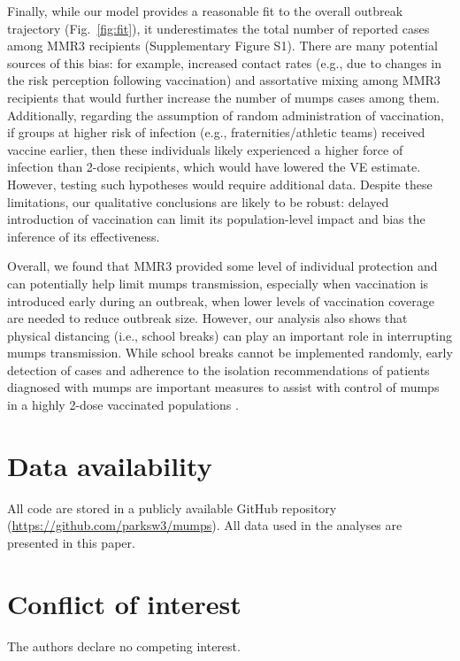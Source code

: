 \documentclass[12pt]{article}
\newcommand{\fref}[1]{Fig.~\ref{fig:#1}}
\begin{document}
Finally, while our model provides a reasonable fit to the overall outbreak trajectory (\fref{fit}), it underestimates the total number of reported cases among MMR3 recipients (Supplementary Figure S1).
There are many potential sources of this bias: for example, increased contact rates (e.g., due to changes in the risk perception following vaccination) and assortative mixing among MMR3 recipients that would further increase the number of mumps cases among them.
Additionally, regarding the assumption of random administration of vaccination, if groups at higher risk of infection (e.g., fraternities/athletic teams) received vaccine earlier, then these individuals likely experienced a higher force of infection than 2-dose recipients, which would have lowered the VE estimate. 
However, testing such hypotheses would require additional data.
Despite these limitations, our qualitative conclusions are likely to be robust: delayed introduction of vaccination can limit its population-level impact and bias the inference of its effectiveness.

Overall, we found that MMR3 provided some level of individual protection and can potentially help limit mumps transmission, especially when vaccination is introduced early during an outbreak, when lower levels of vaccination coverage are needed to reduce outbreak size.  
However, our analysis also shows that physical distancing (i.e., school breaks) can play an important role in interrupting mumps transmission. 
While school breaks cannot be implemented randomly, early detection of cases and adherence to the isolation recommendations of patients diagnosed with mumps are important measures to assist with control of mumps in a highly 2-dose vaccinated populations \citep{shah2022containing}.

\section*{Data availability}

All code are stored in a publicly available GitHub repository (\url{https://github.com/parksw3/mumps}). All data used in the analyses are presented in this paper.

\section*{Conflict of interest}

The authors declare no competing interest.

\pagebreak
\end{document}
